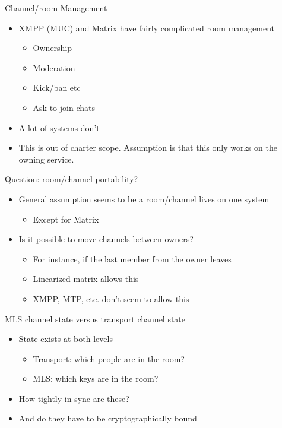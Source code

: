 \documentclass[helvetica]{beamer}
\begin{document}
\begin{frame}{Channel/room Management}

  \begin{itemize}
  \item XMPP (MUC) and Matrix have fairly complicated room management
    \begin{itemize}
    \item Ownership
    \item Moderation
    \item Kick/ban etc
    \item Ask to join chats
    \end{itemize}
  \item A lot of systems don't
  \item This is out of charter scope. Assumption is that this only works on the owning service.
  \end{itemize}

\end{frame}

\begin{frame}{Question: room/channel portability?}

  \begin{itemize}
  \item General assumption seems to be a room/channel lives on one system
    \begin{itemize}
    \item Except for Matrix      
    \end{itemize}
    
  \item Is it possible to move channels between owners?
    \begin{itemize}
    \item For instance, if the last member from the owner leaves
    \item Linearized matrix allows this
    \item XMPP, MTP, etc. don't seem to allow this
    \end{itemize}
  \end{itemize}
\end{frame}

\begin{frame}{MLS channel state versus transport channel state}

  \begin{itemize}
  \item State exists at both levels
    \begin{itemize}
    \item Transport: which people are in the room?
    \item MLS: which keys are in the room?
    \end{itemize}
  \item How tightly in sync are these?
  \item And do they have to be cryptographically bound    
  \end{itemize}
\end{frame}
\end{document}
